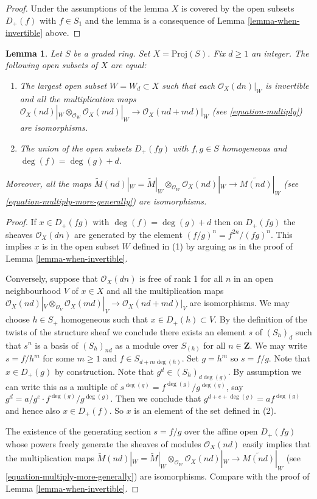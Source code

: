 \documentclass{stacks-project}
\theoremstyle{plain}
\newtheorem{lemma}[subsection]{Lemma}
\theoremstyle{definition}
\theoremstyle{remark}
\numberwithin{equation}{subsection}
\begin{document}
\begin{proof}
Under the assumptions of the lemma $X$ is covered by the
open subsets $D_{+}(f)$ with $f \in S_1$ and the
lemma is a consequence of Lemma \ref{lemma-when-invertible} above.
\end{proof}

\begin{lemma}
\label{lemma-where-invertible}
Let $S$ be a graded ring. Set $X = \text{Proj}(S)$. Fix $d \geq 1$ an
integer. The following open subsets of $X$ are equal:
\begin{enumerate}
\item The largest open subset $W = W_d \subset X$ such that
each $\mathcal{O}_X(dn)|_W$ is invertible and all the
multiplication maps
$\mathcal{O}_X(nd)|_W \otimes_{\mathcal{O}_W} \mathcal{O}_X(md)|_W
\to \mathcal{O}_X(nd + md)|_W$
(see \ref{equation-multiply}) are isomorphisms.
\item The union of the open subsets $D_{+}(fg)$ with
$f, g \in S$ homogeneous and $\deg(f) = \deg(g) + d$.
\end{enumerate}
Moreover, all the maps
$\widetilde M(nd)|_W = \widetilde M|_W \otimes_{\mathcal{O}_W}
\mathcal{O}_X(nd)|_W \to \widetilde{M(nd)}|_W$
(see \ref{equation-multiply-more-generally}) are isomorphisms.
\end{lemma}

\begin{proof}
If $x \in D_{+}(fg)$ with $\deg(f) = \deg(g) + d$ then
on $D_{+}(fg)$ the sheaves $\mathcal{O}_X(dn)$
are generated by the element $(f/g)^n = f^{2n}/(fg)^n$. This implies $x$
is in the open subset $W$ defined in (1) by arguing as in the
proof of Lemma \ref{lemma-when-invertible}.

\medskip\noindent
Conversely, suppose that $\mathcal{O}_X(dn)$ is free of rank 1
for all $n$ in an open neighbourhood $V$ of $x \in X$ and all the
multiplication maps
$\mathcal{O}_X(nd)|_V \otimes_{\mathcal{O}_V} \mathcal{O}_X(md)|_V
\to \mathcal{O}_X(nd + md)|_V$ are isomorphisms.
We may choose $h \in S_{+}$ homogeneous such that $x \in D_{+}(h) \subset V$.
By the definition of the twists of the structure sheaf we conclude there
exists an element $s$ of $(S_h)_d$ such that $s^n$ is a basis of $(S_h)_{nd}$
as a module over $S_{(h)}$ for all $n \in \mathbf{Z}$.
We may write
$s = f/h^m$ for some $m \geq 1$ and $f \in S_{d + m \deg(h)}$.
Set $g = h^m$ so $s = f/g$. Note that $x \in D_{+}(g)$ by construction.
Note that $g^d \in (S_h)_{d\deg(g)}$.
By assumption we can write this as a multiple of
$s^{\deg(g)} = f^{\deg(g)}/g^{\deg(g)}$, say
$g^d = a/g^e \cdot f^{\deg(g)}/g^{\deg(g)}$.
Then we conclude that $g^{d + e + \deg(g)} = a f^{\deg(g)}$
and hence also $x \in D_{+}(f)$. So $x$ is an element of the set defined
in (2).

\medskip\noindent
The existence of the generating section $s = f/g$ over
the affine open $D_{+}(fg)$ whose
powers freely generate the sheaves of modules
$\mathcal{O}_X(nd)$ easily implies that the multiplication maps
$\widetilde M(nd)|_W = \widetilde M|_W \otimes_{\mathcal{O}_W}
\mathcal{O}_X(nd)|_W \to \widetilde{M(nd)}|_W$
(see \ref{equation-multiply-more-generally})
are isomorphisms. Compare with the proof of Lemma \ref{lemma-when-invertible}.
\end{proof}
\end{document}
